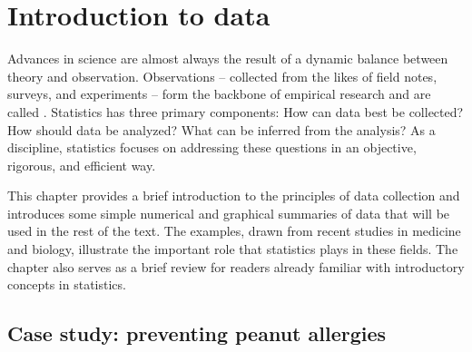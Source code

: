 


\chapter{Introduction to data}
\label{introductionToData}


Advances in science are almost always the result of a dynamic balance between theory and observation. Observations -- collected from the likes of field notes, surveys, and experiments -- form the backbone of empirical research and are called . Statistics has three primary components: How can data best be collected? How should data be analyzed? What can be inferred from the analysis? As a discipline, statistics focuses on addressing these questions in an objective, rigorous, and efficient way.

This chapter provides a brief introduction to the principles of data collection and introduces some simple numerical and graphical summaries of data that will be used in the rest of the text. The examples, drawn from recent studies in medicine and biology, illustrate the important role that statistics plays in these fields. The chapter also serves as a brief review for readers already familiar with introductory concepts in statistics.


\section[Case study]{Case study: preventing peanut allergies}
\label{leapCaseStudy}

